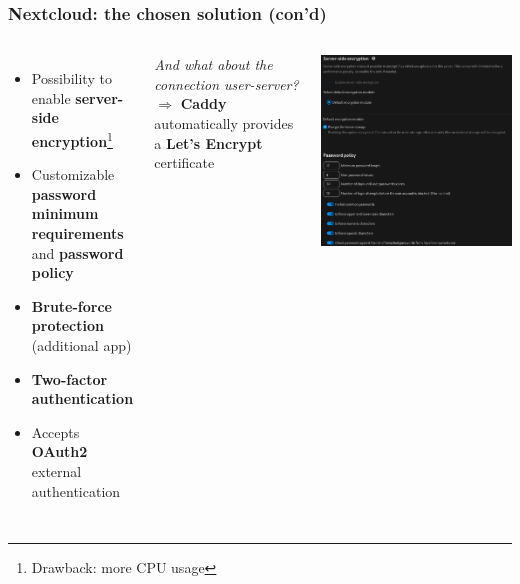 \documentclass{beamer}
\begin{document}
\begin{frame}
    \frametitle{Nextcloud: the chosen solution (con'd)}
    \begin{columns}
            \begin{itemize}
                \item Possibility to enable \textbf{server-side encryption}\footnote{Drawback: more CPU usage}
                \item Customizable \textbf{password minimum requirements} and \textbf{password policy}
                \item \textbf{Brute-force protection} (additional app)
                \item \textbf{Two-factor authentication}
                \item Accepts \textbf{OAuth2} external authentication
            \end{itemize}
            \textit{And what about the connection user-server?} \newline
            $\Rightarrow$ \textbf{Caddy} automatically provides a \textbf{Let's Encrypt} certificate
            \begin{center}
                \vspace{-4em}
                \includegraphics[height=0.45\textheight]{images/other/nextcloud-security}

\end{center}
\end{columns}
\end{frame}
\end{document}

